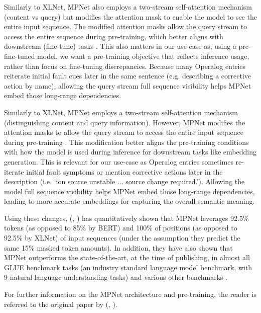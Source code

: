 \documentclass[10pt,oneside]{report}
\renewcommand{\citet}[1]{\citeauthor{#1}, \citeyear{#1}}
\begin{document}
Similarly to XLNet, MPNet also employs a two‑stream self‑attention mechanism (content vs
query) but modifies the attention mask to enable the model to see the entire input sequence. The modified attention masks allow the query stream to access the
entire sequence during pre‑training, which better aligns with downstream (fine-tune) tasks \cite{song2020mpnet}. This also matters in our use-case as, using a pre-fine-tuned model, we want a pre-training objective that reflects inference usage, rather than focus on fine-tuning discrepancies.
Because many Operalog entries reiterate initial fault cues later in the same sentence (e.g. describing a corrective action by name), allowing the query stream full sequence visibility helps MPNet embed those long‑range dependencies.

Similarly to XLNet, MPNet employs a two-stream self-attention mechanism (distinguishing content and query information). However, MPNet modifies the attention masks to allow the query stream to access the entire input sequence during pre-training \cite{song2020mpnet}. This modification better aligns the pre-training conditions with how the model is used during inference for downstream tasks like embedding generation.
This is relevant for our use-case as Operalog entries sometimes re-iterate initial fault symptoms or mention corrective actions later in the description (i.e. `ion source unstable ... source change required.'). Allowing the model full sequence visibility helps MPNet embed those long-range dependencies, leading to more accurate embeddings for capturing the overall semantic meaning.

Using these changes, (\citet{song2020mpnet}) has quantitatively shown that MPNet leverages 92.5\% tokens (as opposed to 85\% by BERT) and 100\% of positions (as opposed to 92.5\% by XLNet) of input sequences (under the assumption they predict the same 15\% masked token amounts). In addition, they have also shown that MPNet outperforms the state-of-the-art, at the time of publishing, in almost all GLUE benchmark tasks (an industry standard language model benchmark, with 9 natural language understanding tasks) and various other benchmarks \cite{wang2018glue}. 

For further information on the MPNet architecture and pre-training, the reader is referred to the original paper by (\citet{song2020mpnet}).
\end{document}
